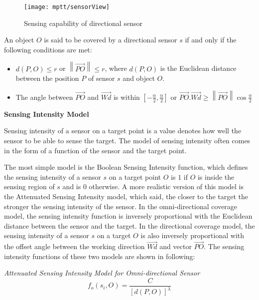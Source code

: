 \documentclass[final]{elsarticle}
\begin{document}
\begin{figure*}[h]
	\centering
	\texttt{[image: mptt/sensorView]}
	\caption{Sensing capability of directional sensor}
	\label{Fig.1}       %
\end{figure*}
An object $ O $ is said to be covered by a directional sensor $ s $ if and only if the following conditions are met: 
\begin{itemize}
	\itemsep0em
	\item $d(P,O) \le r$ or $\left\| {\overrightarrow {PO} } \right\| \le r$, where $d(P,O)$ is the Euclidean distance between the position $ P $ of sensor $s$ and object $ O $.
	\item The angle between $\overrightarrow{PO}$ and $\overrightarrow {Wd} $ is within $\left[ { - \frac{\alpha}{2} ,\frac{\alpha}{2} } \right]$ or $\overrightarrow {PO} .\overrightarrow {Wd}  \ge \left\| {\overrightarrow {PO} } \right\|\cos \frac{\alpha}{2} $	
\end{itemize}

\textbf{Sensing Intensity Model}

Sensing intensity of a sensor on a target point is a value denotes how well the sensor to be able to sense the target. The model of sensing intensity often comes in the form of a function of the sensor and the target point. 

The most simple model is the Boolean Sensing Intensity function, which defines the sensing intensity of a sensor $ s $ on a target point $ O $ is $1$ if $O$ is inside the sensing region of $s$ and is $0$ otherwise. A more realistic version of this model is the Attenuated Sensing Intensity model, which said, the closer to the target the stronger the sensing intensity of the sensor. In the omni-directional coverage model, the sensing intensity function is inversely proportional with the Euclidean distance between the sensor and the target. In the directional coverage model, the sensing intensity of a sensor $s$ on a target $O$ is also inversely proportional with the offset angle between the working direction $\overrightarrow{Wd}$ and vector $\overrightarrow{PO}$. The sensing intensity functions of these two models are shown in following:

\textit{Attenuated Sensing Intensity Model for Omni-directional Sensor}\\
\begin{equation}
\label{eqfo}
f_o({s_i},O) = \frac{C}{{{{\left[ {d(P,O)} \right]}^\lambda }}}
\end{equation}
\end{document}
